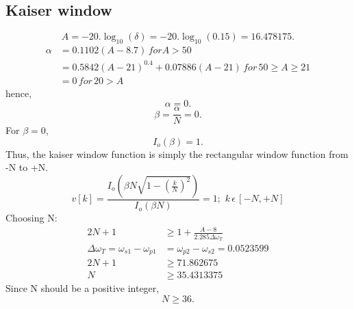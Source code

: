 \documentclass[12pt]{article}
\begin{document}
\subsection{Kaiser window}
\[A = -20.\log_{10}(\delta) = -20.\log_{10}(0.15) = 16.478175.\]
\begin{align*}
    \alpha &= 0.1102(A-8.7) \, for A > 50\\
    &= 0.5842(A-21)^{0.4} + 0.07886(A-21) \, for \, 50 \geq A \geq 21\\
    &= 0 \, for \, 20 > A
\end{align*}
hence,\[\alpha = 0.\]
\[\beta = \frac{\alpha}{N} = 0.\]
For $\beta = 0$,\[I_o(\beta) = 1.\]
Thus, the kaiser window function is simply the rectangular window function from -N to +N.\[v[k] = \frac{I_o\left(\beta N\sqrt{1-(\frac{k}{N})^2}\right)}{I_o(\beta N)} = 1; \,\, k \, \epsilon \, [-N, +N]\]
Choosing N:
\begin{align*}
    2N + 1 &\ge 1 + \frac{A - 8}{2.285\Delta\omega_T}\\
    \Delta\omega_T = \omega_{s1} - \omega_{p1} &= \omega_{p2} - \omega_{s2} = 0.0523599\\
    2N + 1 &\ge 71.862675\\
    N &\ge 35.4313375
\end{align*}
Since N should be a positive integer,\[N \ge 36.\]
\end{document}
